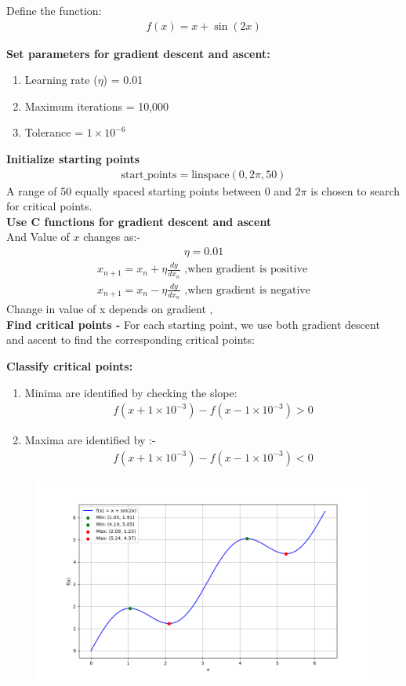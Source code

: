 \documentclass[journal]{IEEEtran}
\numberwithin{equation}{enumi}
\numberwithin{figure}{enumi}
\begin{document}
\begin{enumerate}
Define the function:
    \begin{align}
    f(x) = x + \sin(2x)
    \end{align}

    \textbf{Set parameters for gradient descent and ascent:}
    \begin{enumerate}
        \item Learning rate ($ \eta $) = 0.01
        \item Maximum iterations = 10,000
        \item Tolerance  = $1 \times 10^{-6}$
    \end{enumerate}
    
    \textbf{Initialize starting points}
    \begin{align}
    \text{start\_points} = \text{linspace}(0, 2\pi, 50)
    \end{align}
    A range of 50 equally spaced starting points between $0$ and $2\pi$ is chosen to search for critical points.\\
    
    \textbf{Use C functions for gradient descent and ascent}\\
     And Value of $x$ changes as:-
     \begin{align}
     \eta = 0.01
     \end{align}
     \begin{align}
     x_{n+1} = x_{n} + \eta\frac{dy}{dx_n} \text{ ,when gradient is positive}\\
     x_{n+1} = x_{n} - \eta\frac{dy}{dx_n} \text{ ,when gradient is negative}
     \end{align}
     Change in value of x depends on gradient ,\\
     \textbf{Find critical points - }
     For each starting point, we use both gradient descent and ascent to find the corresponding critical points:

     \textbf{Classify critical points:}
     \begin{enumerate}
        \item Minima are identified by checking the slope:
        \begin{align}
        f(x + 1 \times 10^{-3}) - f(x - 1 \times 10^{-3}) > 0
        \end{align}
        \item Maxima are identified by :-
        \begin{align}
        f(x + 1 \times 10^{-3}) - f(x - 1 \times 10^{-3}) < 0
        \end{align}
    \end{enumerate}
    
\end{enumerate}
\begin{figure}[h!]
   \centering
   \includegraphics[width=0.7\linewidth]{figs/Figure_1.png}
\end{figure}
\end{document}

